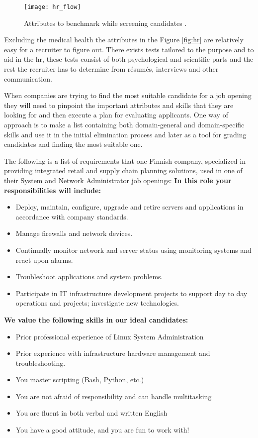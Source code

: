 \documentclass[11pt,a4paper,oneside,article]{memoir}
\begin{document}
\begin{figure}[htbp]
  \centering
    \texttt{[image: hr\_flow]}
  \caption{Attributes to benchmark while screening candidates \cite{nobari:article}.}
  \label{fig:hr}
\end{figure}

Excluding the medical health the attributes in the Figure \vref{fig:hr} are relatively easy for a recruiter to figure out. There exists tests tailored to the purpose and to aid in the \gls{hr}, these tests consist of both psychological and scientific parts and the rest the recruiter has to determine from résumés, interviews and other communication.

When companies are trying to find the most suitable candidate for a job opening they will need to pinpoint the important attributes and skills that they are looking for and then execute a plan for evaluating applicants. One way of approach is to make a list containing both domain-general and domain-specific skills and use it in the initial elimination process and later as a tool for grading candidates and finding the most suitable one.

The following is a list of requirements that one Finnish company, specialized in providing integrated retail and supply chain planning solutions, used in one of their System and Network Administrator job openings: \newline
\textbf{In this role your responsibilities will include:}
\vspace{-17pt} 
\begin{itemize}
\item Deploy, maintain, configure, upgrade and retire servers and applications in accordance with company standards.
\item Manage firewalls and network devices.
\item Continually monitor network and server status using monitoring systems and react upon alarms.
\item Troubleshoot applications and system problems.
\item Participate in IT infrastructure development projects to support day to day operations and projects; investigate new technologies.
\end{itemize}
\vspace{-17pt}

\textbf{We value the following skills in our ideal candidates:}
\vspace{-17pt} 
\begin{itemize}
\item Prior professional experience of Linux System Administration
\item Prior experience with infrastructure hardware management and troubleshooting.
\item You master scripting (Bash, Python, etc.)
\item You are not afraid of responsibility and can handle multitasking
\item You are fluent in both verbal and written English
\item You have a good attitude, and you are fun to work with!
\end{itemize}
\vspace{-17pt}
\end{document}
